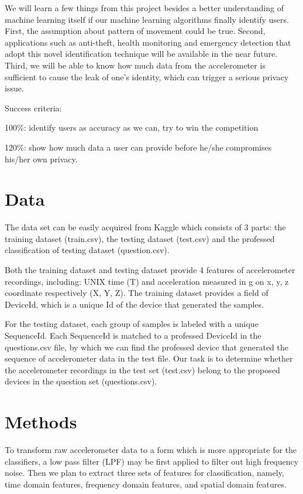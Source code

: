 \documentclass[12pt]{article}
\begin{document}
We will learn a few things from this project besides a better understanding of machine learning itself if our machine learning algorithms finally identify users. First, the assumption about pattern of movement could be true. Second, applications such as anti-theft, health monitoring and emergency detection that adopt this novel identification technique will be available in the near future. Third, we will be able to know how much data from the accelerometer is sufficient to cause the leak of one's identity, which can trigger a serious privacy issue. 

Success criteria:

100\%: identify users as accuracy as we can, try to win the competition

120\%: show how much data a user can provide before he/she compromises his/her own privacy. 

\section{Data}
The data set can be easily acquired from Kaggle which consists of 3 parts: the training dataset (train.csv), the testing dataset (test.csv) and the professed classification of testing dataset (question.csv).



Both the training dataset and testing dataset provide 4 features of accelerometer recordings, including: UNIX time (T) and acceleration measured in g on x, y, z coordinate respectively (X, Y, Z). The training dataset provides a field of DeviceId, which is a unique Id of the device that generated the samples. 


For the testing dataset, each group of samples is labeled with a unique SequenceId. Each SequenceId is matched to a professed DeviceId in the questions.csv file, by which we can find the professed device that generated the sequence of accelerometer data in the test file.
Our task is to determine whether the accelerometer recordings in the test set (test.csv) belong to the proposed devices in the question set (questions.csv).




\section{Methods}
To transform raw accelerometer data to a form which is more appropriate for the classifiers, a low pass filter (LPF) may be first applied to filter out high frequency noise. Then we plan to extract three sets of features for classification, namely, time domain features, frequency domain features, and spatial domain features.
\end{document}
